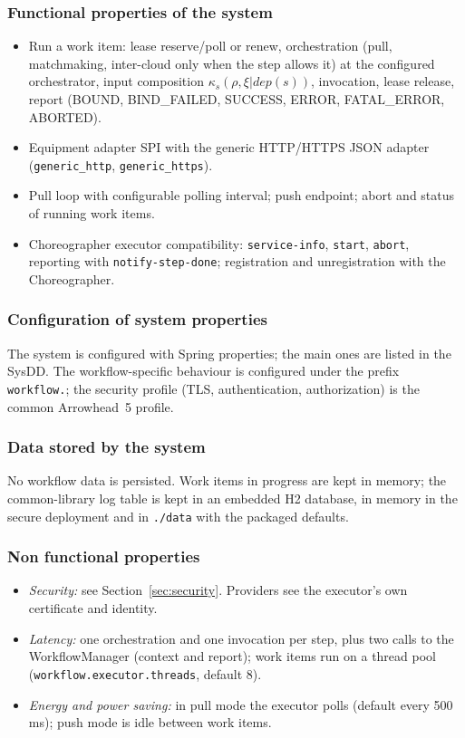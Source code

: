 \documentclass[a4paper]{arrowhead}
\begin{document}
\subsubsection{Functional properties of the system}
\begin{itemize}
\item Run a work item: lease reserve/poll or renew, orchestration (pull, matchmaking, inter-cloud only when the step
allows it) at the configured orchestrator, input composition $\kappa_s(\rho, \xi|dep(s))$, invocation, lease release,
report (BOUND, BIND\_FAILED, SUCCESS, ERROR, FATAL\_ERROR, ABORTED).
\item Equipment adapter SPI with the generic HTTP/HTTPS JSON adapter (\texttt{generic\_http}, \texttt{generic\_\allowbreak{}https}).
\item Pull loop with configurable polling interval; push endpoint; abort and status of running work items.
\item Choreographer executor compatibility: \texttt{service-info}, \texttt{start}, \texttt{abort}, reporting with
\texttt{notify-\allowbreak{}step-\allowbreak{}done}; registration and unregistration with the Choreographer.
\end{itemize}

\subsubsection{Configuration of system properties}
The system is configured with Spring properties; the main ones are listed in the SysDD. The workflow-specific behaviour
is configured under the prefix \texttt{workflow.}; the security profile (TLS, authentication, authorization) is the
common Arrowhead~5 profile.

\subsubsection{Data stored by the system}
No workflow data is persisted. Work items in progress are kept in memory; the common-library log table is kept in an
embedded H2 database, in memory in the secure deployment and in \texttt{./data} with the packaged defaults.

\subsubsection{Non functional properties}
\begin{itemize}
\item \emph{Security:} see Section~\ref{sec:security}. Providers see the executor's own certificate and identity.
\item \emph{Latency:} one orchestration and one invocation per step, plus two calls to the WorkflowManager (context and
report); work items run on a thread pool (\texttt{workflow.\allowbreak{}executor.\allowbreak{}threads}, default 8).
\item \emph{Energy and power saving:} in pull mode the executor polls (default every 500\,ms); push mode is idle
between work items.
\end{itemize}
\end{document}
